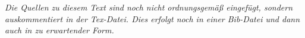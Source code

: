 \documentclass{Bericht}
\begin{document}
\textit{Die Quellen zu diesem Text sind noch nicht ordnungsgemäß eingefügt, sondern auskommentiert in der Tex-Datei. Dies erfolgt noch in einer Bib-Datei und dann auch in zu erwartender Form.}
\end{document}
